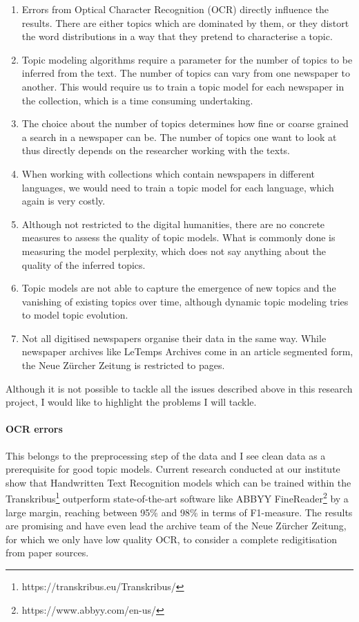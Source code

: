 \begin{enumerate}
    \item Errors from Optical Character Recognition (OCR) directly influence the results. There are either topics which are dominated by them, or they distort the word distributions in a way that they pretend to characterise a topic.
    \item Topic modeling algorithms require a parameter for the number of topics to be inferred from the text. The number of topics can vary from one newspaper to another. This would require us to train a topic model for each newspaper in the collection, which is a time consuming undertaking.
    \item The choice about the number of topics determines how fine or coarse grained a search in a newspaper can be. The number of topics one want to look at thus directly depends on the researcher working with the texts. 
    \item When working with collections which contain newspapers in different languages, we would need to train a topic model for each language, which again is very costly.
    \item Although not restricted to the digital humanities, there are no concrete measures to assess the quality of topic models. What is commonly done is measuring the model perplexity, which does not say anything about the quality of the inferred topics.
    \item Topic models are not able to capture the emergence of new topics and the vanishing of existing topics over time, although dynamic topic modeling tries to model topic evolution.
    \item Not all digitised newspapers organise their data in the same way. While newspaper archives like LeTemps Archives come in an article segmented form, the Neue Zürcher Zeitung is restricted to pages.
\end{enumerate}

Although it is not possible to tackle all the issues described above in this research project, I would like to highlight the problems I will tackle.

\paragraph{OCR errors} This belongs to the preprocessing step of the data and I see clean data as a prerequisite for good topic models. Current research conducted at our institute show that Handwritten Text Recognition models which can be trained within the Transkribus\footnote{https://transkribus.eu/Transkribus/} outperform state-of-the-art software like ABBYY FineReader\footnote{https://www.abbyy.com/en-us/} by a large margin, reaching between 95\%  and 98\% in terms of F1-measure. The results are promising and have even lead the archive team of the Neue Zürcher Zeitung, for which we only have low quality OCR, to consider a complete redigitisation from paper sources.

